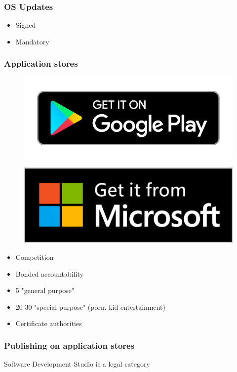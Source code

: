 \begin{frame}[fragile]
\frametitle{OS Updates}

\begin{itemize}
\item Signed
\item Mandatory
\end{itemize}

\end{frame}

\begin{frame}[fragile]
\frametitle{Application stores}


\begin{figure}
\includegraphics{google_badge}
\end{figure}
\begin{figure}
\includegraphics[scale=0.15]{microsoft_badge}
\end{figure}


\end{frame}

\begin{itemize}
\item Competition
\item Bonded accountability
\item 5 "general purpose"
\item 20-30 "special purpose" (porn, kid entertainment)
\item Certificate authorities
\end{itemize}

\begin{frame}[fragile]
\frametitle{Publishing on application stores}

Software Development Studio is a legal category

\end{frame}

